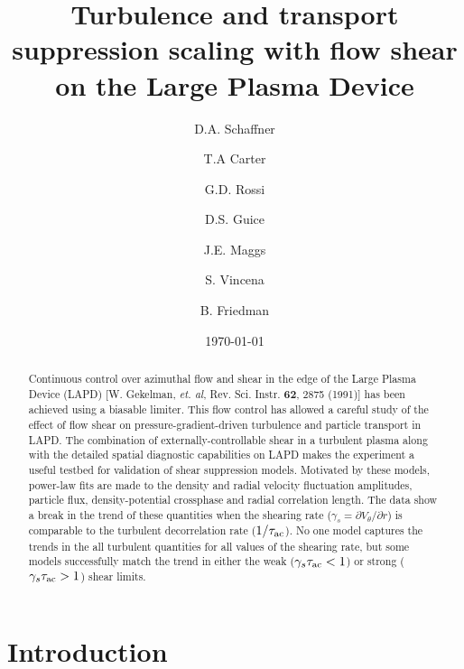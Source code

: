 \documentclass[aip,pop,amsmath,amssymb,peprint,superscriptaddress]{revtex4-1} %
\begin{document}
\title{Turbulence and transport suppression scaling with flow shear on the Large Plasma Device}
\author{D.A. Schaffner}
\author{T.A Carter}
\author{G.D. Rossi}
\author{D.S. Guice}
\author{J.E. Maggs}
\author{S. Vincena}
\author{B. Friedman}
\date{\today}
\begin{abstract}
Continuous control over azimuthal flow and shear in the edge of the
Large Plasma Device (LAPD) [W. Gekelman, \textit{et. al},
  Rev. Sci. Instr. \textbf{62}, 2875 (1991)] has been achieved using a
biasable limiter.  This flow control has allowed a careful study of
the effect of flow shear on pressure-gradient-driven turbulence and
particle transport in LAPD. The combination of externally-controllable
shear in a turbulent plasma along with the detailed spatial diagnostic
capabilities on LAPD makes the experiment a useful testbed for
validation of shear suppression models. Motivated by these models,
power-law fits are made to the density and radial velocity fluctuation
amplitudes, particle flux, density-potential crossphase and radial
correlation length.  The data show a break in the trend of these
quantities  when the shearing rate ($\gamma_s = \partial
V_\theta/\partial r$) is comparable to the turbulent decorrelation
rate ($1/\tau_{\rm ac}$).  No one model captures the trends in the
all turbulent quantities for all values of  the shearing rate, but
some models successfully match the trend in either the weak
($\gamma_s \tau_{\rm ac} < 1$) or strong ($\gamma_s \tau_{\rm ac} >
1$) shear limits. 
\end{abstract}
\maketitle

\section{Introduction}
\end{document}
